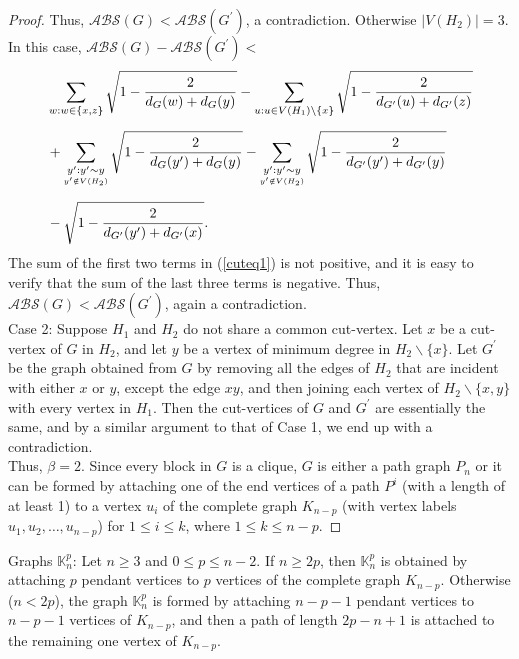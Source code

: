 \documentclass[12pt]{article}
\begin{document}
\begin{proof}
Thus, $\mathcal{ABS}(G)<\mathcal{ABS}(G^{\prime})$, a contradiction. Otherwise $|V(H_{2})|=3$. In this case,
$\mathcal{ABS}(G)-\mathcal{ABS}(G^{\prime})<$\\
\begin{align}\label{cuteq1}\allowdisplaybreaks&\displaystyle\sum_{w:w\in\{x,z\}}\sqrt{1-\dfrac{2}{d_{G}(w)+d_{G}(y)}}-\sum_{u:u\in V(H_{1})\backslash\{x\}}\sqrt{1-\dfrac{2}{d_{G^{\prime}}(u)+d_{G^{\prime}}(z)}}\notag\\[2mm]&+
\sum_{\underset{ y^{\prime}\notin  V(H_{2})}{y^{\prime}: y^{\prime}\sim y} }\sqrt{1-\dfrac{2}{d_{G}(y^{\prime})+d_{G}(y)}}-\sum_{\underset{ y^{\prime}\notin  V(H_{2})}{y^{\prime}: y^{\prime}\sim y} }\sqrt{1-\dfrac{2}{d_{G^{\prime}}(y^{\prime})+d_{G^{\prime}}(y)}}\notag\\[2mm]
&-\sqrt{1-\dfrac{2}{d_{G^{\prime}}(y^{\prime})+d_{G^{\prime}}(x)}}.
\end{align}
The sum of the first two terms in (\ref{cuteq1}) is not positive, and it is easy to verify that the sum of the last three terms is negative. Thus, $\mathcal{ABS}(G)<\mathcal{ABS}(G^{\prime})$, again a contradiction.\\[2mm] 
Case 2: Suppose $H_{1}$ and $H_{2}$ do not share a common cut-vertex. Let $x$ be a cut-vertex of $G$ in $H_{2}$, and let $y$ be a vertex of minimum degree in $H_{2}\backslash \{x\}$. Let $G^{\prime}$ be the graph obtained from $G$ by removing all the edges of $H_{2}$ that are incident with either $x$ or $y$, except the edge $xy$, and then joining each vertex of $H_{2}\backslash \{x,y\}$ with every vertex in $H_{1}$. Then the cut-vertices of $G$ and $G^{\prime}$ are essentially the same, and by a similar argument to that of Case 1, we end up with a contradiction.\\[2mm] 
Thus, $\beta=2$. Since every block in $G$ is a clique, $G$ is either a path graph $P_{n}$ or it can be formed by attaching one of the end vertices of a path $P^{i}$ (with a length of at least 1) to a vertex $u_i$ of the complete graph $K_{n-p}$ (with vertex labels $u_1,u_2,\ldots,u_{n-p}$) for $1\le i \le k$, where $1\le k\le n-p$.
\end{proof}
\noindent
Graphs $\mathbb{K}_{n}^{p}$: Let $n\ge 3$ and $0\le p\le n-2$. If $n\ge 2p$, then  $\mathbb{K}_n^p$ is obtained by attaching $p$ pendant vertices to $p$ vertices of the complete graph $K_{n-p}$. Otherwise ($n<2p$), the graph  $\mathbb{K}_n^p$ is formed by attaching $n-p-1$ pendant vertices to $n-p-1$ vertices of $K_{n-p}$, and then a path of length $2p-n+1$ is attached to the remaining one vertex of $K_{n-p}$.
\end{document}
